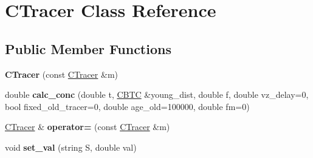 \hypertarget{class_c_tracer}{}\section{C\+Tracer Class Reference}
\label{class_c_tracer}
\subsection*{Public Member Functions}
\begin{DoxyCompactItemize}
\item 
\mbox{\label{class_c_tracer_a85793139a6682998b5561dd076907a72}} 
{\bfseries C\+Tracer} (const \hyperlink{class_c_tracer}{C\+Tracer} \&m)
\item 
\mbox{\label{class_c_tracer_ae57f274e6750c1954dcb0c2c24fd0a2b}} 
double {\bfseries calc\+\_\+conc} (double t, \hyperlink{class_c_b_t_c}{C\+B\+TC} \&young\+\_\+dist, double f, double vz\+\_\+delay=0, bool fixed\+\_\+old\+\_\+tracer=0, double age\+\_\+old=100000, double fm=0)
\item 
\mbox{\label{class_c_tracer_ab284438c43da9d02743c101b77ff0250}} 
\hyperlink{class_c_tracer}{C\+Tracer} \& {\bfseries operator=} (const \hyperlink{class_c_tracer}{C\+Tracer} \&m)
\item 
\mbox{\label{class_c_tracer_ad6ed481f70c20e96925cf30d1e8229b4}} 
void {\bfseries set\+\_\+val} (string S, double val)
\end{DoxyCompactItemize}
